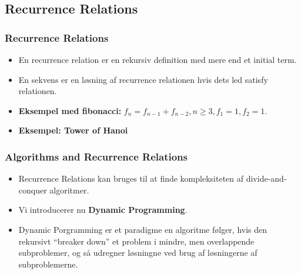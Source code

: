 \documentclass{beamer}
\begin{document}
\subsection{Recurrence Relations}
\label{subsec:recurrencerelations}

\begin{frame}
  \frametitle{Recurrence Relations}
 \begin{itemize}
 \item En recurrence relation er en rekursiv definition med mere end et initial term. 
 \item En sekvens er en løsning af recurrence relationen hvis dets led satisfy relationen. 
 \item \textbf{Eksempel med fibonacci:} $f_{n} = f_{n-1} + f_{n-2}, n \geq 3, f_{1} = 1, f_{2} = 1$.
 \item \textbf{Eksempel: Tower of Hanoi}
 \end{itemize} 
\end{frame}

\begin{frame}[allowframebreaks]
  \frametitle{Algorithms and Recurrence Relations}
 \begin{itemize}
 \item Recurrence Relations kan bruges til at finde kompleksiteten af divide-and-conquer algoritmer. 
 \item Vi introducerer nu \textbf{Dynamic Programming}. 
 \item Dynamic Porgramming er et paradigme en algoritme følger, hvis den rekursivt ``breaker down'' et problem i mindre, men overlappende subproblemer, og så udregner løsningne ved brug af løsningerne af subproblemerne. 
 \end{itemize} 
\end{frame}
\end{document}

